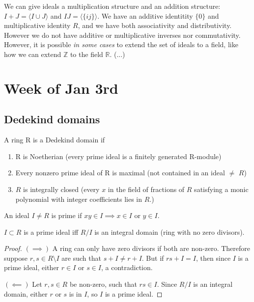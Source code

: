 We can give ideals a multiplication structure and an addition structure: $I+ J=\langle I\cup J\rangle$ and $IJ=\langle \{ij\} \rangle$. We have an additive identitity $\{0\}$ and multiplicative identity $R$, and we have both associativity and distributivity. However we do not have additive or multiplicative inverses nor commutativity. However, it is possible \textit{in some cases} to extend the set of ideals to a field,  like how we can extend $\mathbb{Z}$ to the field $\mathbb{R}$. (...)

\section{Week of Jan 3rd}
\subsection{Dedekind domains}
\begin{definition}
A ring R is a Dedekind domain if
\begin{enumerate}
    \item R is Noetherian (every prime ideal is a finitely generated R-module)
    \item Every nonzero prime ideal of R is maximal (not contained in an ideal $\neq$ $R$)
    \item $R$ is integrally closed (every $x$ in the field of fractions of $R$ satisfying a monic polynomial with integer coefficients lies in $R$.)
\end{enumerate}
\end{definition}
\begin{definition}
An ideal $I\neq R$ is prime if $xy\in I\implies x\in I$ or $y\in I$.
\end{definition}

\begin{prop}
$I\subset R$ is a prime ideal iff $R/I$ is an integral domain (ring with no zero divisors).
\end{prop}
\begin{proof}
$(\implies)$ A ring can only have zero divisors if both are non-zero. Therefore suppose $r,s\in R\setminus{I}$ are such that $s+I\neq r+I$. But if $rs+I=I$, then since $I$ is a prime ideal, either $r\in I$ or $s\in I$, a contradiction.

$(\impliedby)$ Let $r,s\in R$ be non-zero, such that $rs\in I$. Since $R/I$ is an integral domain, either $r$ or $s$ is in $I$, so $I$ is a prime ideal.
\end{proof}


